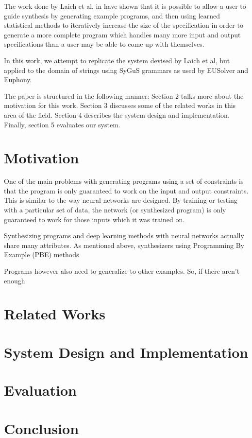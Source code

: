\documentclass[sigconf,authordraft]{acmart}
\begin{document}
The work done by Laich et al. in \cite{laich2020guiding} have shown that it is
possible to allow a user to guide synthesis by generating example programs,
and then using learned statistical methods to iteratively increase the size
of the specification in order to generate a more complete program which handles
many more input and output specifications than a user may be able to come up
with themselves.

In this work, we attempt to replicate the system devised by Laich et al, but
applied to the domain of strings using SyGuS grammars as used by EUSolver and
Euphony.

The paper is structured in the following manner: Section 2 talks more about the
motivation for this work. Section 3 discusses some of the related works in this
area of the field. Section 4 describes the system design and implementation.
Finally, section 5 evaluates our system.

\section{Motivation}


One of the main problems with generating programs using a set of constraints
is that the program is only guaranteed to work on the input and output constraints.
This is similar to the way neural networks are designed. By training or testing with a
particular set of data, the network (or synthesized program) is only guaranteed
to work for those inputs which it was trained on.

Synthesizing programs and deep learning methods with neural networks actually
share many attributes. As mentioned above, synthesizers using Programming By
Example (PBE) methods 

Programs however also need to generalize to other examples. So, if there aren't
enough


\section{Related Works}

\section{System Design and Implementation}

\section{Evaluation}

\section{Conclusion}



\end{document}
